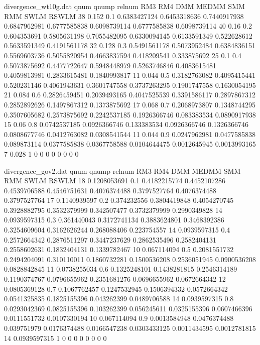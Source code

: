 \begin{filecontents*}{divergence_wt10g.dat}
qnum	qnump	relnum	RM3	RM4	DMM	MEDMM	SMM	RMM	SWLM	RSWLM
38	0.152	0.1	0.6383427124	0.6453318636	0.7440917938	0.6847962981	0.6777585838	0.6098739114	0.6777585838	0.6098739114
40	0.16	0.2	0.604353691	0.5805631198	0.7055482095	0.6330094145	0.6133591349	0.522628612	0.5633591349	0.4191561178
32	0.128	0.3	0.5491561178	0.5073952484	0.6384836151	0.5569603736	0.5055820954	0.4663837594	0.418209541	0.333875692
25	0.1	0.4	0.5073875692	0.4477722647	0.5948448979	0.5263746846	0.4083615481	0.4059813981	0.2833615481	0.1840993817
11	0.044	0.5	0.3182763082	0.4095415441	0.520231146	0.4061943631	0.3601747558	0.3737263295	0.1901747558	0.1630054195
21	0.084	0.6	0.2826459451	0.2039493165	0.4047525539	0.3391586117	0.2897867312	0.2852892626	0.1497867312	0.1373875692
17	0.068	0.7	0.2068973807	0.1348744295	0.3507605682	0.2573875692	0.2242537185	0.1926366746	0.083383534	0.0890917938
15	0.06	0.8	0.0742537185	0.0926366746	0.133383534	0.0926366746	0.1326366746	0.0808677746	0.0412763082	0.0308541544
11	0.044	0.9	0.0247962981	0.0477585838	0.089873114	0.0377585838	0.0367758588	0.0104644475	0.0012645945	0.0013993165
7	0.028	1	0	0	0	0	0	0	0	0
\end{filecontents*}



\begin{filecontents*}{divergence_gov2.dat}
qnum	qnump	relnum	RM3	RM4	DMM	MEDMM	SMM	RMM	SWLM	RSWLM
18	0.1208053691	0.1	0.4182215774	0.4452107286	0.4539706588	0.4546751631	0.4076374488	0.3797527764	0.4076374488	0.3797527764
17	0.1140939597	0.2	0.374232556	0.3804419848	0.4054270745	0.3928882795	0.3532379999	0.342507477	0.3732379999	0.2990349828
14	0.0939597315	0.3	0.361440043	0.3172741134	0.3883624801	0.3468392386	0.3254609604	0.3162626244	0.268088406	0.223754557
14	0.0939597315	0.4	0.2572664342	0.2876511297	0.3447237629	0.2862535496	0.2582404131	0.2558602631	0.1832404131	0.1339782467
10	0.067114094	0.5	0.2081551732	0.2494204091	0.310110011	0.1860732281	0.1500536208	0.2536051945	0.0900536208	0.0828842845
11	0.0738255034	0.6	0.1325248101	0.1438281815	0.2546314189	0.1190374767	0.0796655962	0.2351681276	0.0696655962	0.0672664342
12	0.0805369128	0.7	0.1067762457	0.1247532945	0.1506394332	0.0572664342	0.0541325835	0.1825155396	0.043262399	0.0489706588
14	0.0939597315	0.8	0.0293042369	0.0825155396	0.103262399	0.056245611	0.0325155396	0.0607466396	0.0111551732	0.0107330194
10	0.067114094	0.9	0.0013584948	0.0476374488	0.039751979	0.0176374488	0.0166547238	0.0303433125	0.0011434595	0.0012781815
14	0.0939597315	1	0	0	0	0	0	0	0	0
\end{filecontents*}



